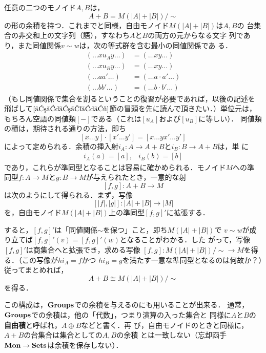 \begin{example}
 任意の二つのモノイド$A, B$は，
 \[
  A + B = M(|A| + |B|)/\sim
 \]
 の形の余積を持つ．これまでと同様，自由モノイド$M(|A| + |B|)$は$A, B$の
 台集合の非交和上の文字列（語），すなわち$A$と$B$の両方の元からなる文字
 列であり，また同値関係$v \sim w$は，次の等式群を含む最小の同値関係であ
 る．
 \begin{align*}
  (\ldots x u_A y \ldots) &= (\ldots x y \ldots)\\
  (\ldots x u_B y \ldots) &= (\ldots x y \ldots)\\
  (\ldots a a' \ldots)    &= (\ldots a \cdot a' \ldots)\\
  (\ldots b b' \ldots)    &= (\ldots b \cdot b' \ldots)
 \end{align*}
 （もし同値関係で集合を割るということの復習が必要であれば，以後の記述を
 飛ばして$\ref{コイコライザ}$節の冒頭を先に読んで頂きたい．）単位元は，
 もちろん空語の同値類$[-]$である（これは$[u_A]$および$[u_B]$に等しい）．
 同値類の積は，期待される通りの方法，即ち
 \[
  [x \ldots y] \cdot [x' \ldots y']
   = [x \ldots y x' \ldots y']
 \]
 によって定められる．余積の挿入射$i_A: A \to A+B$と$i_B:B \to A+B$は，単
 に
 \[
  \begin{array}{ll}
   i_A(a) = [a],&  i_B(b) = [b]
  \end{array}
 \]
 であり，これらが準同型となることは容易に確かめられる．モノイド$M$への準
 同型$f: A \to M$と$g: B \to M$が与えられたとき，一意的な射
 \[
  [f, g]: A + B \to M
 \]
 は次のようにして得られる．まず，写像
 \[
  [|f|, |g|]: |A| + |B| \to |M|
 \]
 を，自由モノイド$M(|A| + |B|)$上の準同型$[f, g]'$に拡張する．
 \begin{center}
 \end{center}
 すると，$[f, g]'$は「同値関係$\sim$を保つ」こと，即ち$M(|A|+|B|)$で
 $v\sim w$が成り立てば$[f, g]'(v) = [f, g]'(w)$となることがわかる．した
 がって，写像$[f, g]'$は商集合へと拡張でき，求める写像
 $[f, g]:M(|A|+|B|)/\sim \to M$を得る．（この写像が$hi_A = f$かつ
 $hi_B=g$を満たす一意な準同型となるのは何故か？）従ってまとめれば，
 \[
  A + B \cong M(|A|+|B|)/\sim
 \]
 を得る．

 この構成は，${\bf Groups}$での余積を与えるのにも用いることが出来る．
 通常，${\bf Groups}$での余積は，他の「代数」，つまり演算の入った集合と
 同様に$A$と$B$の{\bfseries 自由積}と呼ばれ，$A \oplus B$などと書く．再
 び，自由モノイドのときと同様に，$A+B$の台集合は集合としての$A, B$の余積
 とは一致しない（忘却函手$\mathbf{Mon} \to \mathbf{Sets}$は余積を保存しない）．
\end{example}

